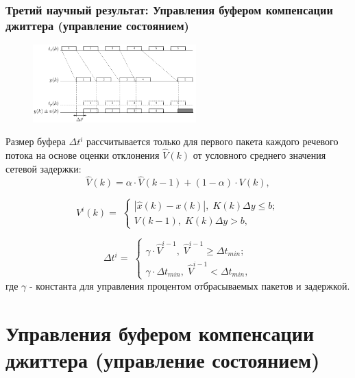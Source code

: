 \documentclass[10pt,pdf,hyperref={unicode}]{beamer}
\begin{document}
\begin{frame}
\frametitle{Третий научный результат: Управления буфером компенсации джиттера (управление состоянием)}

\begin{scriptsize}
\begin{figure}[!h]
\centering
\includegraphics[height=3cm]{timing_buffer.png}
\label{fig:man_5}
\end{figure}

Размер буфера $\Delta t^i$ рассчитывается только для первого пакета каждого речевого потока на основе оценки отклонения $\hat V (k)$ от условного среднего значения сетевой задержки:
\begin{equation}\label{eq41:syntes3}
\hat{V}(k)=\alpha\cdot\hat{V}(k-1)+(1-\alpha)\cdot V(k),
\end{equation}

\begin{equation}\label{eq41:syntes4}
V^i(k)= \;
\begin{cases}
| \hat{x}(k)-x(k) |, \; K(k)\Delta y \leq b; \\    
V(k-1), \;  K(k)\Delta y > b,    
\end{cases}
\end{equation}

\begin{equation}\label{eq41:syntes5}
\Delta t^i= \;
\begin{cases}
\gamma\cdot\hat{V}^{i-1}, \; \hat{V}^{i-1} \geq \Delta t_{min}; \\    
\gamma\cdot\Delta t_{min}, \;  \hat{V}^{i-1} < \Delta t_{min},    
\end{cases}
\end{equation}
\noindent где $\gamma$ - константа для управления процентом отбрасываемых пакетов и задержкой.
\end{scriptsize}

\end{frame}

\section{Управления буфером компенсации джиттера (управление состоянием)}
\end{document}
